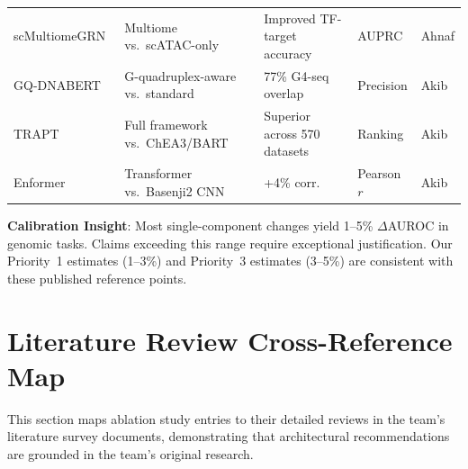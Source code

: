 \documentclass[11pt,a4paper]{article}
\begin{document}
\begin{longtable}{L{2.5cm}L{3.5cm}L{3cm}L{2cm}L{2cm}}
scMultiomeGRN~\cite{scmultiomegrn} & Multiome vs.\ scATAC-only & Improved TF-target accuracy & AUPRC & Ahnaf \\

GQ-DNABERT~\cite{gq_dnbert} & G-quadruplex-aware vs.\ standard & 77\% G4-seq overlap & Precision & Akib \\

TRAPT~\cite{trapt} & Full framework vs.\ ChEA3/BART & Superior across 570 datasets & Ranking & Akib \\

Enformer~\cite{enformer} & Transformer vs.\ Basenji2 CNN & +4\% corr.\ & Pearson $r$ & Akib \\

\end{longtable}

\textbf{Calibration Insight}: Most single-component changes yield 1--5\% $\Delta$AUROC in genomic tasks. Claims exceeding this range require exceptional justification. Our Priority~1 estimates (1--3\%) and Priority~3 estimates (3--5\%) are consistent with these published reference points.

\section{Literature Review Cross-Reference Map}
\label{sec:crossref_map}

This section maps ablation study entries to their detailed reviews in the team's literature survey documents, demonstrating that architectural recommendations are grounded in the team's original research.
\end{document}
